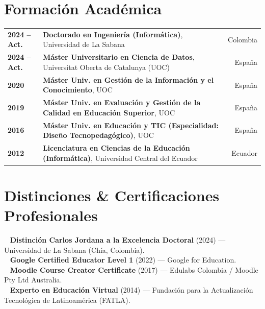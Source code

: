 \documentclass[10pt,a4paper]{article}
\begin{document}
\section{Formación Académica}
\begin{tabularx}{\textwidth}{@{}p{2.4cm} X r@{}}
\textbf{2024 – Act.} & \textbf{Doctorado en Ingeniería (Informática)}, Universidad de La Sabana & Colombia\\
\textbf{2024 – Act.} & \textbf{Máster Universitario en Ciencia de Datos}, Universitat Oberta de Catalunya (UOC) & España\\
\textbf{2020} & \textbf{Máster Univ. en Gestión de la Información y el Conocimiento}, UOC & España\\
\textbf{2019} & \textbf{Máster Univ. en Evaluación y Gestión de la Calidad en Educación Superior}, UOC & España\\
\textbf{2016} & \textbf{Máster Univ. en Educación y TIC (Especialidad: Diseño Tecnopedagógico)}, UOC & España\\
\textbf{2012} & \textbf{Licenciatura en Ciencias de la Educación (Informática)}, Universidad Central del Ecuador & Ecuador\\
\end{tabularx}

\vspace{5pt}

\section{Distinciones \& Certificaciones Profesionales}
\textbullet~ \textbf{Distinción Carlos Jordana a la Excelencia Doctoral} (2024) — Universidad de La Sabana (Chía, Colombia).\\
\textbullet~ \textbf{Google Certified Educator Level 1} (2022) — Google for Education.\\
\textbullet~ \textbf{Moodle Course Creator Certificate} (2017) — Edulabs Colombia / Moodle Pty Ltd Australia.\\
\textbullet~ \textbf{Experto en Educación Virtual} (2014) — Fundación para la Actualización Tecnológica de Latinoamérica (FATLA).

\vspace{5pt}

\end{document}
